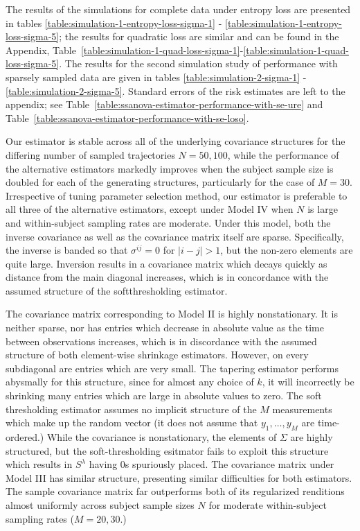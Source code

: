 
The results of the simulations for complete data under entropy loss are presented in tables \ref{table:simulation-1-entropy-loss-sigma-1} - \ref{table:simulation-1-entropy-loss-sigma-5}; the results for quadratic loss are similar and can be found in the Appendix, Table~\ref{table:simulation-1-quad-loss-sigma-1}-\ref{table:simulation-1-quad-loss-sigma-5}. The results for the second simulation study of performance with sparsely sampled data are given in tables \ref{table:simulation-2-sigma-1} - \ref{table:simulation-2-sigma-5}.  Standard errors of the risk estimates are left to the appendix; see Table~\ref{table:ssanova-estimator-performance-with-se-ure} and Table~\ref{table:ssanova-estimator-performance-with-se-loso}.

\bigskip


Our estimator is stable across all of the underlying covariance  structures for the differing number of sampled trajectories $N = 50, 100$, while the performance of the alternative estimators markedly improves when the subject sample size is doubled for each of the generating structures, particularly for the case of $M = 30$. Irrespective of tuning parameter selection method, our estimator is preferable to all three of the alternative estimators, except under Model IV when $N$ is large and within-subject sampling rates are moderate. Under this model, both the inverse covariance as well as the covariance matrix itself are sparse. Specifically, the inverse is banded so that $\sigma^{ij} = 0$ for $\vert i - j \vert > 1$, but the non-zero elements are quite large. Inversion results in a covariance matrix which decays quickly as distance from the main diagonal increases, which is in concordance with the assumed structure of the softthresholding estimator. 

\bigskip

The covariance matrix corresponding to Model II is highly nonstationary. It is neither sparse, nor has entries which decrease in absolute value as the time between observations increases, which is in discordance with the assumed structure of both element-wise shrinkage estimators. However, on every subdiagonal are entries which are very small. The tapering estimator performs abysmally for this structure, since for almost any choice of $k$, it will incorrectly be shrinking many entries which are large in absolute values to zero. The soft thresholding estimator assumes no implicit structure of the $M$ measurements which make up the random vector (it does not assume that $y_1,\dots, y_M$ are time-ordered.) While the covariance is nonstationary, the elements of $\Sigma$ are highly structured, but the soft-thresholding esitmator fails to exploit this structure which results in $S^\lambda$ having 0s spuriously placed. The covariance matrix under Model III has similar structure, presenting similar difficulties for both estimators. The sample covariance matrix far outperforms both of its regularized renditions almost uniformly across subject sample sizes $N$ for moderate within-subject sampling rates ($M = 20, 30$.)
 
